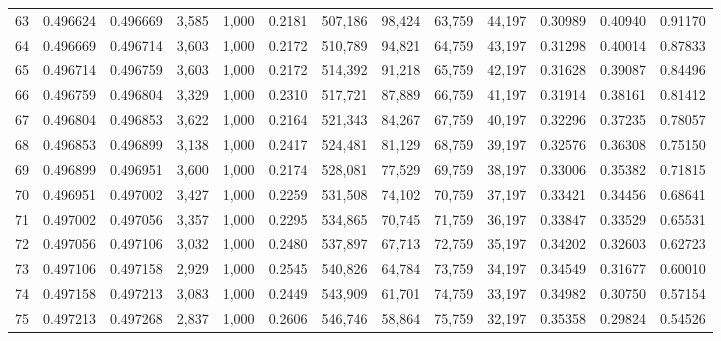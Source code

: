 \begin{tabular}{rrrrrrrrrrrrr}
63  &  0.496624 &  0.496669 &   3,585 &  1,000 &                                     0.2181 &  507,186 &   98,424 &   63,759 &   44,197 &  0.30989 &  0.40940 &  0.91170 \\
64  &  0.496669 &  0.496714 &   3,603 &  1,000 &                                     0.2172 &  510,789 &   94,821 &   64,759 &   43,197 &  0.31298 &  0.40014 &  0.87833 \\
65  &  0.496714 &  0.496759 &   3,603 &  1,000 &                                     0.2172 &  514,392 &   91,218 &   65,759 &   42,197 &  0.31628 &  0.39087 &  0.84496 \\
66  &  0.496759 &  0.496804 &   3,329 &  1,000 &                                     0.2310 &  517,721 &   87,889 &   66,759 &   41,197 &  0.31914 &  0.38161 &  0.81412 \\
67  &  0.496804 &  0.496853 &   3,622 &  1,000 &                                     0.2164 &  521,343 &   84,267 &   67,759 &   40,197 &  0.32296 &  0.37235 &  0.78057 \\
68  &  0.496853 &  0.496899 &   3,138 &  1,000 &                                     0.2417 &  524,481 &   81,129 &   68,759 &   39,197 &  0.32576 &  0.36308 &  0.75150 \\
69  &  0.496899 &  0.496951 &   3,600 &  1,000 &                                     0.2174 &  528,081 &   77,529 &   69,759 &   38,197 &  0.33006 &  0.35382 &  0.71815 \\
70  &  0.496951 &  0.497002 &   3,427 &  1,000 &                                     0.2259 &  531,508 &   74,102 &   70,759 &   37,197 &  0.33421 &  0.34456 &  0.68641 \\
71  &  0.497002 &  0.497056 &   3,357 &  1,000 &                                     0.2295 &  534,865 &   70,745 &   71,759 &   36,197 &  0.33847 &  0.33529 &  0.65531 \\
72  &  0.497056 &  0.497106 &   3,032 &  1,000 &                                     0.2480 &  537,897 &   67,713 &   72,759 &   35,197 &  0.34202 &  0.32603 &  0.62723 \\
73  &  0.497106 &  0.497158 &   2,929 &  1,000 &                                     0.2545 &  540,826 &   64,784 &   73,759 &   34,197 &  0.34549 &  0.31677 &  0.60010 \\
74  &  0.497158 &  0.497213 &   3,083 &  1,000 &                                     0.2449 &  543,909 &   61,701 &   74,759 &   33,197 &  0.34982 &  0.30750 &  0.57154 \\
75  &  0.497213 &  0.497268 &   2,837 &  1,000 &                                     0.2606 &  546,746 &   58,864 &   75,759 &   32,197 &  0.35358 &  0.29824 &  0.54526 \\

\end{tabular}
